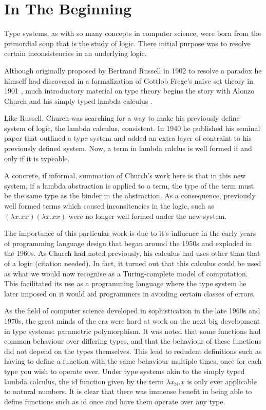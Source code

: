 \chapter{In The Beginning}
    Type systems, as with so many concepts in computer science,
    were born from the primordial soup that is the study of
    logic. There initial purpose was to resolve certain
    inconsistencies in an underlying logic. 

    Although originally proposed by Bertrand Russell in 1902 to
    resolve a paradox he himself had discovered in a formalization of
    Gottlob Frege's naive set theory in 1901 \cite{Russell1901}, much
    introductory material on type theory begins the story with
    Alonzo Church and his simply typed lambda calculus
    \cite{church1940}.

    Like Russell, Church was searching for a way to make his
    previously define system of logic, the lambda calculus,
    consistent. In 1940 he published his seminal paper that outlined a
    type system and added an extra layer of contraint to his
    previously defined system. Now, a term in lambda calclus is well
    formed if and only if it is typeable.

    A concrete, if informal, summation of Church's work here is that
    in this new system, if a lambda abstraction is applied to a term,
    the type of the term must be the same type as the binder in the
    abstraction. As a consequence, previously well formed terms which
    caused inconsitencies in the logic, such as
    $ (\lambda x.xx)(\lambda x.xx)  $
    were no longer well formed under the new system.

    The importance of this particular work is due to it's influence in
    the early years of programming language design that began around
    the 1950s and exploded in the 1960s. As Church had noted
    previously, his calculus had uses other than that of a logic
    (citation needed). In fact, it turned out that this calculus could
    be used as what we would now recognise as a Turing-complete model
    of computation. This facilitated its use as a programming
    language where the type system he later imposed on it would aid
    programmers in avoiding certain classes of errors.

    As the field of computer science developed in sophistication in
    the late 1960s and 1970s, the great minds of the era were hard at
    work on the next big development in type systems: parametric
    polymorphism. It was noted that some functions had common
    behaviour over differing types, and that the behaviour of these
    functions did not depend on the types themselves. This lead to
    redudent definitions such as having to define a function with the
    same behaviour multiple times, once for each type you wish to
    operate over. Under type systems akin to the simply typed lambda
    calculus, the id function given by the term $\lambda
    x_{\mathbb{N}}.x $ is only ever applicable to natural numbers. It
    is clear that there was immense benefit in being able to define
    functions such as id once and have them operate over any type.

